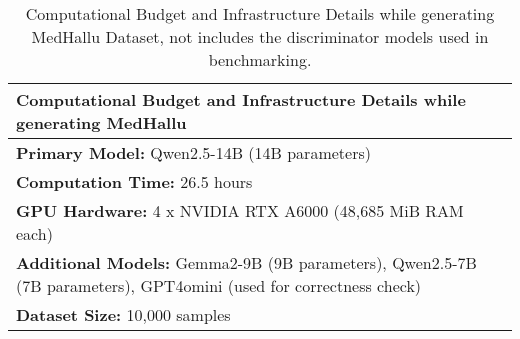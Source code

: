 \begin{table}
\centering
\begin{tabular}{p{}}
\toprule
\textbf{Computational Budget and Infrastructure Details while generating MedHallu} \\
\midrule
\textbf{Primary Model:} Qwen2.5-14B (14B parameters) \\[1ex]
\textbf{Computation Time:} 26.5 hours \\[1ex]
\textbf{GPU Hardware:} 4 x NVIDIA RTX A6000 (48,685 MiB RAM each) \\[1ex]
\textbf{Additional Models:} Gemma2-9B (9B parameters), Qwen2.5-7B (7B parameters), GPT4omini (used for correctness check) \\[1ex]
\textbf{Dataset Size:} 10,000 samples \\
\bottomrule
\end{tabular}
\caption{Computational Budget and Infrastructure Details while generating MedHallu Dataset, not includes the discriminator models used in benchmarking.}
\label{tab:comp-details}
\end{table}
